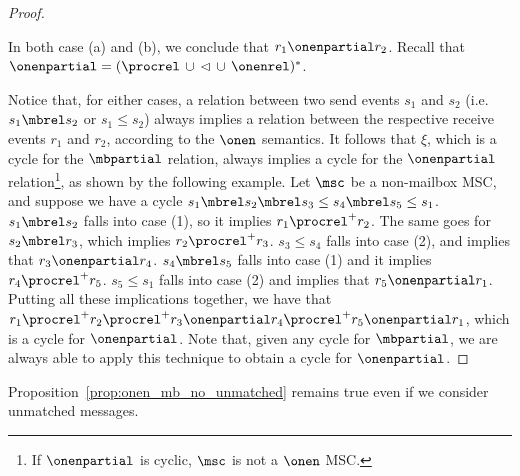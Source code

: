 \begin{proof}
\begin{enumerate}
\begin{enumerate}
	\end{enumerate}
	In both case (a) and (b), we conclude that $r_1 \onenpartial r_2$. Recall that ${\onenpartial} = ({\procrel} \,\cup\, {\lhd} \,\cup\, {\onenrel})^\ast$.
\end{enumerate}
Notice that, for either cases, a relation between two send events $s_1$ and $s_2$ (i.e. $s_1 \mbrel s_2$ or $s_1 \le s_2$) always implies a relation between the respective receive events $r_1$ and $r_2$, according to the $\onen$ semantics. It follows that $\xi$, which is a cycle for the $\mbpartial$ relation, always implies a cycle for the $\onenpartial$ relation\footnote{If $\onenpartial$ is cyclic, $\msc$ is not a $\onen$ MSC.}, as shown by the following example. Let $\msc$ be a non-mailbox MSC, and suppose we have a cycle $s_1 \mbrel s_2 \mbrel s_3 \le s_4 \mbrel s_5 \le s_1$. $s_1 \mbrel s_2$ falls into case (1), so it implies $r_1 \procrel^+ r_2$. The same goes for $s_2 \mbrel r_3$, which implies $r_2 \procrel^+ r_3$. $s_3 \le s_4$ falls into case (2), and implies that $r_3 \onenpartial r_4$. $s_4 \mbrel s_5$ falls into case (1) and it implies $r_4 \procrel^+ r_5$. $s_5 \le s_1$ falls into case (2) and implies that $r_5 \onenpartial r_1$. Putting all these implications together, we have that $r_1 \procrel^+ r_2 \procrel^+ r_3 \onenpartial r_4 \procrel^+ r_5 \onenpartial r_1$, which is a cycle for $\onenpartial$. Note that, given any cycle for $\mbpartial$, we are always able to apply this technique to obtain a cycle for $\onenpartial$.
\end{proof}

Proposition~\ref{prop:onen_mb_no_unmatched} remains true even if we consider unmatched messages.

